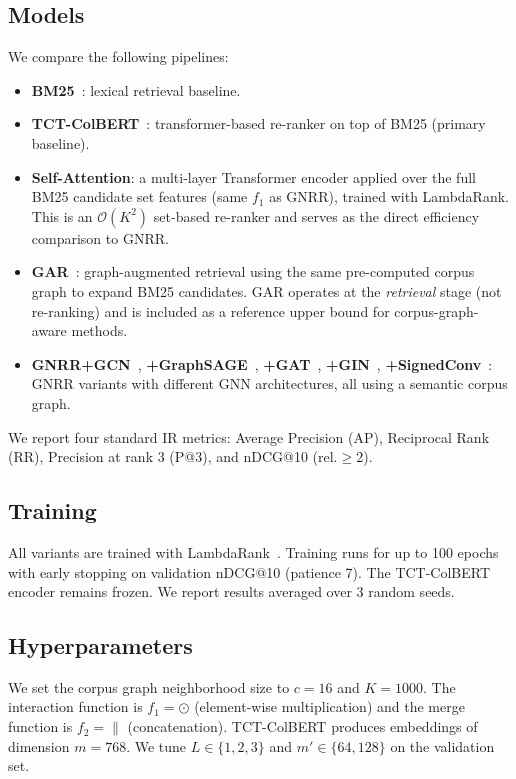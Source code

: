 \documentclass[runningheads]{llncs}
\newcommand{\ModelName}{GNRR\xspace}
\begin{document}
\subsection{Models}
We compare the following pipelines:
\begin{itemize}
    \item \textbf{BM25}~\cite{bm25}: lexical retrieval baseline.
    \item \textbf{TCT-ColBERT}~\cite{tctcolbert}: transformer-based re-ranker on top of BM25 (primary baseline).
    \item \textbf{Self-Attention}: a multi-layer Transformer encoder applied over the full BM25 candidate set features (same $f_1$ as \ModelName), trained with LambdaRank. This is an $\mathcal{O}(K^2)$ set-based re-ranker and serves as the direct efficiency comparison to \ModelName.
    \item \textbf{GAR}~\cite{corpusgraph}: graph-augmented retrieval using the same pre-computed corpus graph to expand BM25 candidates. GAR operates at the \emph{retrieval} stage (not re-ranking) and is included as a reference upper bound for corpus-graph-aware methods.
    \item \textbf{GNRR+GCN}~\cite{GCN}, \textbf{+GraphSAGE}~\cite{GraphSAGE}, \textbf{+GAT}~\cite{GAT}, \textbf{+GIN}~\cite{GIN}, \textbf{+SignedConv}~\cite{signedconv}: \ModelName variants with different GNN architectures, all using a semantic corpus graph.
\end{itemize}
We report four standard IR metrics: Average Precision (AP), Reciprocal Rank (RR), Precision at rank 3 (P@3), and nDCG@10 (rel.$\geq 2$).

\subsection{Training}
All variants are trained with LambdaRank~\cite{lambdarank}. Training runs for up to 100 epochs with early stopping on validation nDCG@10 (patience 7). The TCT-ColBERT encoder remains frozen. We report results averaged over 3 random seeds.

\subsection{Hyperparameters}
We set the corpus graph neighborhood size to $c = 16$ and $K = 1000$. The interaction function is $f_1 = \odot$ (element-wise multiplication) and the merge function is $f_2 = \|$ (concatenation). TCT-ColBERT produces embeddings of dimension $m = 768$. We tune $L \in \{1, 2, 3\}$ and $m' \in \{64, 128\}$ on the validation set.
\end{document}
